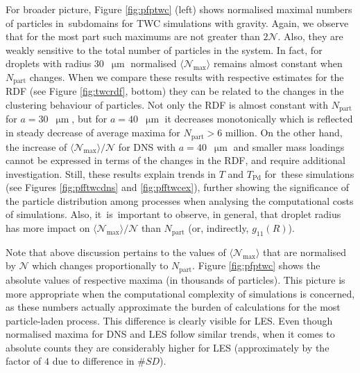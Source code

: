 \documentclass{pracamgren}
\begin{document}
For broader picture, Figure \ref{fig:pfptwc} (left) shows normalised maximal numbers of particles in~subdomains for TWC simulations with gravity.
Again, we observe that for the most part such maximums are not greater than $2 \mathcal{N}$.
Also, they are weakly sensitive to the total number of particles in the system.
In fact, for droplets with radius $30$~$\upmu\text{m}$ normalised $\langle \mathcal{N}_{\max} \rangle$ remains almost constant when $N_{\text{part}}$ changes.
When we compare these results with respective estimates for the RDF (see Figure \ref{fig:twcrdf}, bottom) they can be related to the changes in the clustering behaviour of particles.
Not only the RDF is almost constant with $N_{\text{part}}$ for $a = 30$~$\upmu\text{m}$, but for $a = 40$~$\upmu\text{m}$ it decreases monotonically which is reflected in steady decrease of average maxima for $N_{\text{part}} > 6$ million.
On the other hand, the increase of $\langle \mathcal{N}_{\max} \rangle / \mathcal{N}$ for DNS with $a = 40$~$\upmu\text{m}$ and smaller mass loadings cannot be expressed in terms of the changes in the RDF, and require additional investigation.
Still, these results explain trends in $T$ and $T_{\text{Pd}}$ for~these simulations (see Figures \ref{fig:pfftwcdns} and \ref{fig:pfftwcex}), further showing the significance of the particle distribution among processes when analysing the computational costs of simulations.
Also, it~is~important to observe, in general, that droplet radius has more impact on $\langle \mathcal{N}_{\max} \rangle / \mathcal{N}$ than $N_{\text{part}}$ (or, indirectly, $g_{11}(R)$).

Note that above discussion pertains to the values of $\langle \mathcal{N}_{\max} \rangle$  that are normalised by $\mathcal{N}$ which changes proportionally to $N_{\text{part}}$.
Figure \ref{fig:pfptwc} shows the absolute values of respective maxima (in thousands of particles).
This picture is more appropriate when the computational complexity of simulations is concerned, as these numbers actually approximate the burden of calculations for the most particle-laden process.
This difference is clearly visible for LES.
Even though normalised maxima for DNS and LES follow similar trends, when it comes to absolute counts they are considerably higher for LES (approximately by the factor of $4$ due to difference in $\#SD$).
\end{document}
